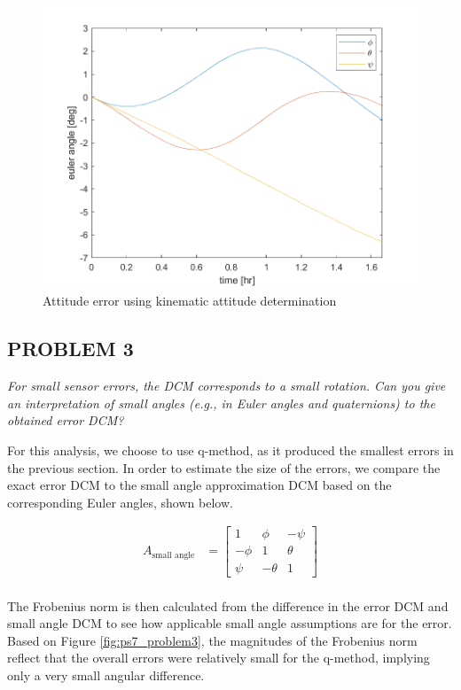 \begin{figure}[H]
\centering
\includegraphics[scale=0.6]{Images/ps7_problem2_kin.png}
\caption{Attitude error using kinematic attitude determination}
\label{fig:ps7_problem2_kin}
\end{figure}

\subsection{PROBLEM 3}
\textit{For small sensor errors, the DCM corresponds to a small rotation. Can you give an interpretation of small angles (e.g., in Euler angles and quaternions) to the obtained error DCM?}

For this analysis, we choose to use q-method, as it produced the smallest errors in the previous section. In order to estimate the size of the errors, we compare the exact error DCM to the small angle approximation DCM based on the corresponding Euler angles, shown below.

\begin{align*}
    A_{\text{small angle}} &= 
    \begin{bmatrix}
        1 & \phi & -\psi \\
        -\phi & 1 & \theta \\
        \psi & -\theta & 1
    \end{bmatrix} \\
\end{align*}

The Frobenius norm is then calculated from the difference in the error DCM and small angle DCM to see how applicable small angle assumptions are for the error. Based on Figure \ref{fig:ps7_problem3}, the magnitudes of the Frobenius norm reflect that the overall errors were relatively small for the q-method, implying only a very small angular difference.

